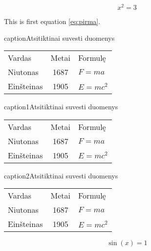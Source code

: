\documentclass[12pt, a4paper, onecolumn, titlepage, oneside, intlimits]{report}
\begin{document}
 





% 
\ktuinit{}    

\begin{equation}\label{eq:pirma}
x^2=3
\end{equation} 

This is first equation \ref{eq:pirma}.


\begin{ktutable}{caption}{Atsitiktinai suvesti duomenys}
    \begin{tabular}{lcl}
      Vardas & Metai & Formulę \\
      Niutonas   & 1687 & $F = m a$ \\
      Einšteinas & 1905 & $E = m c^2$ \\
    \end{tabular}
\end{ktutable}

\begin{ktutable}{caption1}{Atsitiktinai suvesti duomenys}
    \begin{tabular}{lcl}
      Vardas & Metai & Formulę \\
      Niutonas   & 1687 & $F = m a$ \\
      Einšteinas & 1905 & $E = m c^2$ \\
    \end{tabular}
\end{ktutable}

\begin{ktutable}{caption2}{Atsitiktinai suvesti duomenys}
    \begin{tabular}{lcl}
      Vardas & Metai & Formulę \\
      Niutonas   & 1687 & $F = m a$ \\
      Einšteinas & 1905 & $E = m c^2$ \\
    \end{tabular}
\end{ktutable}
\newpage



\newpage 

\begin{equation}
\sin(x)=1 
\end{equation}
\end{document}
